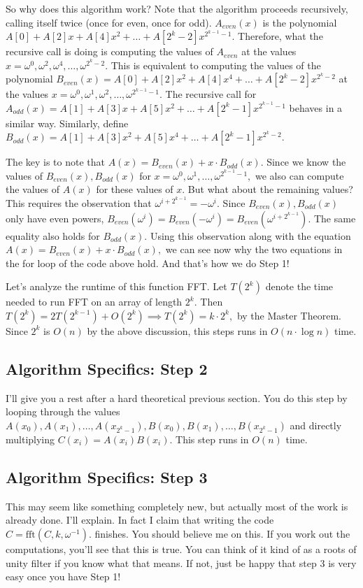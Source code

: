 So why does this algorithm work? Note that the algorithm proceeds recursively, calling itself twice (once for even, once for odd). $A_{even}(x)$ is the polynomial $A[0] + A[2]x + A[4]x^2 + \dots + A[2^k-2]x^{2^{k-1}-1}.$ Therefore, what the recursive call is doing is computing the values of $A_{even}$ at the values $x = \omega^0, \omega^2, \omega^4, \dots, \omega^{2^k-2}.$ This is equivalent to computing the values of the polynomial $B_{even}(x) = A[0] + A[2]x^2 + A[4]x^4 + \dots + A[2^k-2]x^{2^{k}-2}$ at the values $x = \omega^0, \omega^1, \omega^2, \dots, \omega^{2^{k-1}-1}.$ The recursive call for $A_{odd}(x) = A[1] + A[3]x + A[5]x^2 + \dots + A[2^k-1]x^{2^{k-1}-1}$ behaves in a similar way. Similarly, define $B_{odd}(x) = A[1] + A[3]x^2 + A[5]x^4 + \dots + A[2^k-1]x^{2^{k}-2}.$

The key is to note that $A(x) = B_{even}(x) + x \cdot B_{odd}(x).$ Since we know the values of $B_{even}(x), B_{odd}(x)$ for $x = \omega^0, \omega^1, \dots, \omega^{2^{k-1}-1},$ we also can compute the values of $A(x)$ for these values of $x$. But what about the remaining values? This requires the observation that $\omega^{i + 2^{k-1}} = -\omega^i.$ Since $B_{even}(x), B_{odd}(x)$ only have even powers, $B_{even}(\omega^i) = B_{even}(-\omega^i) = B_{even}(\omega^{i + 2^{k-1}}).$ The same equality also holds for $B_{odd}(x).$ Using this observation along with the equation $A(x) = B_{even}(x) + x \cdot B_{odd}(x),$ we can see now why the two equations in the for loop of the code above hold. And that's how we do Step 1!

Let's analyze the runtime of this function FFT. Let $T(2^k)$ denote the time needed to run FFT on an array of length $2^k.$ Then $T(2^k) = 2T(2^{k-1}) + O(2^k) \implies T(2^k) = k \cdot 2^k,$ by the Master Theorem. Since $2^k$ is $O(n)$ by the above discussion, this steps runs in $O(n \cdot \log n)$ time.

\subsection{Algorithm Specifics: Step 2}

I'll give you a rest after a hard theoretical previous section. You do this step by looping through the values $A(x_0), A(x_1), \dots, A(x_{2^k-1}), B(x_0), B(x_1), \dots, B(x_{2^k-1})$ and directly multiplying $C(x_i) = A(x_i)B(x_i).$ This step runs in $O(n)$ time.

\subsection{Algorithm Specifics: Step 3}

This may seem like something completely new, but actually most of the work is already done. I'll explain. In fact I claim that writing the code $C = \text{fft}(C, k, \omega^{-1}).$ finishes. You should believe me on this. If you work out the computations, you'll see that this is true. You can think of it kind of as a roots of unity filter if you know what that means. If not, just be happy that step 3 is very easy once you have Step 1!